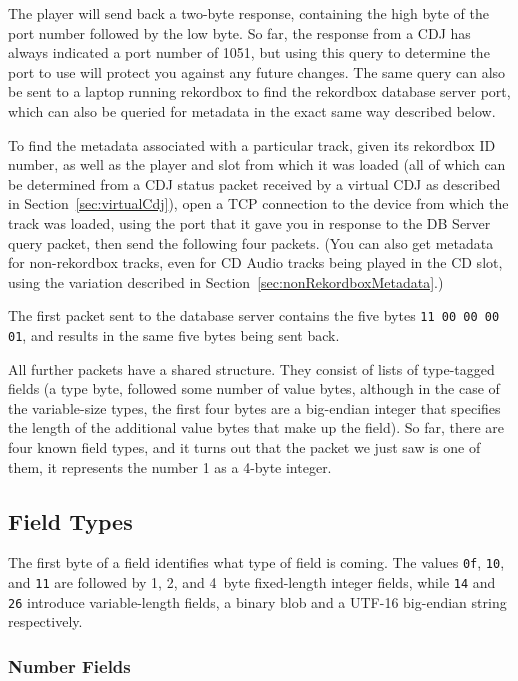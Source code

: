 \documentclass[11pt]{article}
\begin{document}
The player will send back a two-byte response, containing the high
byte of the port number followed by the low byte. So far, the response
from a CDJ has always indicated a port number of 1051, but using this
query to determine the port to use will protect you against any future
changes. The same query can also be sent to a laptop running rekordbox
to find the rekordbox database server port, which can also be queried
for metadata in the exact same way described below.

To find the metadata associated with a particular track, given its
rekordbox ID number, as well as the player and slot from which it was
loaded (all of which can be determined from a CDJ status packet
received by a virtual CDJ as described in
Section~\ref{sec:virtualCdj}), open a TCP connection to the device
from which the track was loaded, using the port that it gave you in
response to the DB Server query packet, then send the following four
packets. (You can also get metadata for non-rekordbox tracks, even for
CD Audio tracks being played in the CD slot, using the variation
described in Section~\ref{sec:nonRekordboxMetadata}.)

The first packet sent to the database server contains the five bytes
{\tt 11 00 00 00 01}, and results in the same five bytes being sent
back.

All further packets have a shared structure. They consist of lists of
type-tagged fields (a type byte, followed some number of value bytes,
although in the case of the variable-size types, the first four bytes
are a big-endian integer that specifies the length of the additional
value bytes that make up the field). So far, there are four known
field types, and it turns out that the packet we just saw is one of
them, it represents the number 1 as a 4-byte integer.

\subsection{Field Types}

The first byte of a field identifies what type of field is coming. The
values {\tt 0f}, {\tt 10}, and {\tt 11} are followed by 1, 2, and
4~byte fixed-length integer fields, while {\tt 14} and {\tt 26}
introduce variable-length fields, a binary blob and a UTF-16
big-endian string respectively.

\subsubsection{Number Fields}
\end{document}
